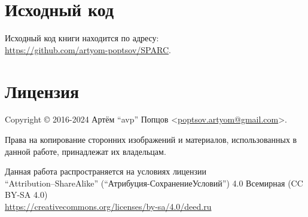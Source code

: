\documentclass[../sparc.tex]{subfiles}
\begin{document}
\section*{Исходный код}

Исходный код книги находится по адресу: \\
\url{https://github.com/artyom-poptsov/SPARC}.

\section*{Лицензия}

Copyright © 2016-2024 Артём ``avp'' Попцов <\href{mailto:poptsov.artyom@gmail.com}{poptsov.artyom@gmail.com}>.

Права на копирование сторонних изображений и материалов, использованных в данной
работе, принадлежат их владельцам.

Данная работа распространяется на условиях лицензии
\\ ``Attribution--ShareAlike'' (``Атрибуция-СохранениеУсловий'') 4.0 Всемирная
(CC BY-SA 4.0) \\ \url{https://creativecommons.org/licenses/by-sa/4.0/deed.ru}
\end{document}
